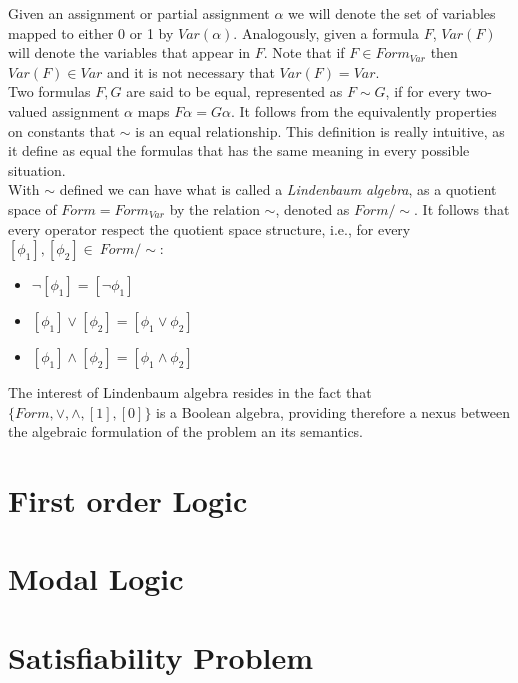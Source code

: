 Given an assignment or partial assignment $\alpha$ we will denote the set of variables mapped to either 0 or 1 by $Var(\alpha)$. Analogously, given a formula $F$, $Var(F)$ will denote the variables that appear in $F$. Note that if $F\in Form_{Var}$ then $Var(F)\in Var$ and it is not necessary that $Var(F)=Var$.\\


Two formulas $F,G$ are said to be equal, represented as $F\sim G$, if for every two-valued assignment $\alpha$ maps $F\alpha = G\alpha$. It follows from the equivalently properties on constants that $\sim$ is an equal relationship. This definition is really intuitive, as it define as equal the formulas that has the same meaning in every possible situation. \\



\label{def:linden}
With $\sim$ defined we can have what is called a \emph{Lindenbaum algebra}, as a quotient space of $Form = Form_{Var}$ by the relation $\sim$, denoted as $Form/\sim$. It follows that every operator respect the quotient space structure, i.e., for every $[\phi_1],[\phi_2]\in\ Form/\sim$:

\begin{itemize}
\item $\neg [\phi_1] = [\neg\phi_1]$
\item $ [\phi_1] \vee [\phi_2]= [\phi_1 \vee \phi_2]$
\item $ [\phi_1] \wedge [\phi_2]= [\phi_1 \wedge \phi_2]$
\end{itemize}

The interest of Lindenbaum algebra resides in the fact that $\{Form, \vee,\wedge,[1],[0]\}$ is a Boolean algebra, providing therefore a nexus between the algebraic formulation of the problem an its semantics.



\section{First order Logic}

\section{Modal Logic}

\section{Satisfiability Problem}
















